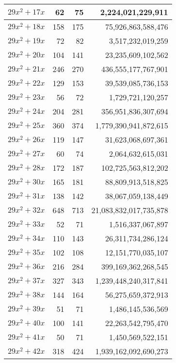 \documentclass[a4paper]{amsproc}
\theoremstyle{plain}
\begin{document}
\begin{longtable}{ | l | r | r | r | }
$29x^2 + 17x$ & 62 & 75 & 2{,}224{,}021{,}229{,}911 \\ \hline
$29x^2 + 18x$ & 158 & 175 & 75{,}926{,}863{,}588{,}476 \\ \hline
$29x^2 + 19x$ & 72 & 82 & 3{,}517{,}232{,}019{,}259 \\ \hline
$29x^2 + 20x$ & 104 & 141 & 23{,}235{,}609{,}102{,}562 \\ \hline
$29x^2 + 21x$ & 246 & 270 & 436{,}555{,}177{,}767{,}901 \\ \hline
$29x^2 + 22x$ & 129 & 153 & 39{,}539{,}085{,}736{,}153 \\ \hline
$29x^2 + 23x$ & 56 & 72 & 1{,}729{,}721{,}120{,}257 \\ \hline
$29x^2 + 24x$ & 204 & 281 & 356{,}951{,}836{,}307{,}694 \\ \hline
$29x^2 + 25x$ & 360 & 374 & 1{,}779{,}390{,}941{,}872{,}615 \\ \hline
$29x^2 + 26x$ & 119 & 147 & 31{,}623{,}068{,}697{,}361 \\ \hline
$29x^2 + 27x$ & 60 & 74 & 2{,}064{,}632{,}615{,}031 \\ \hline
$29x^2 + 28x$ & 172 & 187 & 102{,}725{,}563{,}812{,}202 \\ \hline
$29x^2 + 30x$ & 165 & 181 & 88{,}809{,}913{,}518{,}825 \\ \hline
$29x^2 + 31x$ & 138 & 142 & 38{,}067{,}059{,}138{,}449 \\ \hline
$29x^2 + 32x$ & 648 & 713 & 21{,}083{,}832{,}017{,}735{,}878 \\ \hline
$29x^2 + 33x$ & 52 & 71 & 1{,}516{,}337{,}067{,}897 \\ \hline
$29x^2 + 34x$ & 110 & 143 & 26{,}311{,}734{,}286{,}124 \\ \hline
$29x^2 + 35x$ & 102 & 108 & 12{,}151{,}770{,}035{,}107 \\ \hline
$29x^2 + 36x$ & 216 & 284 & 399{,}169{,}362{,}268{,}545 \\ \hline
$29x^2 + 37x$ & 327 & 343 & 1{,}239{,}448{,}240{,}317{,}841 \\ \hline
$29x^2 + 38x$ & 144 & 164 & 56{,}275{,}659{,}372{,}913 \\ \hline
$29x^2 + 39x$ & 51 & 71 & 1{,}486{,}145{,}536{,}569 \\ \hline
$29x^2 + 40x$ & 100 & 141 & 22{,}263{,}542{,}795{,}470 \\ \hline
$29x^2 + 41x$ & 50 & 71 & 1{,}450{,}569{,}522{,}151 \\ \hline
$29x^2 + 42x$ & 318 & 424 & 1{,}939{,}162{,}092{,}690{,}273 \\ \hline

\end{longtable}
\end{document}
